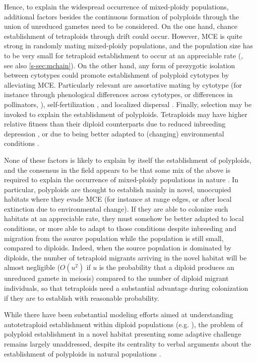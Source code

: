 \documentclass[11pt,a4paper]{article}
\begin{document}
Hence, to explain the widespread occurrence of mixed-ploidy populations,
additional factors besides the continuous formation of polyploids through the
union of unreduced gametes need to be considered.
On the one hand, chance establishment of tetraploids through drift could occur.
However, MCE is quite strong in randomly mating mixed-ploidy populations, and
the population size has to be very small for tetraploid establishment to occur
at an appreciable rate (\cite{rausch2005}, see also \cref{s-sec:mchain}).
On the other hand, any form of prezygotic isolation between cytotypes could
promote establishment of polyploid cytotypes by alleviating MCE.
Particularly relevant are assortative mating by cytotype  (for instance through
phenological differences across cytotypes, or differences in pollinators,
\citep{kolar2017}), self-fertilization \citep{rausch2005}, and localized
dispersal \citep{baack2005,kolar2017}.
Finally, selection may be invoked to explain the establishment of polyploids.
Tetraploids may have higher relative fitness than their diploid counterparts
due to reduced inbreeding depression \citep{ronfort1999}, or due to being
better adapted to (changing) environmental conditions \citep{vandepeer2021}. 

None of these factors is likely to explain by itself the establishment of
polyploids, and the consensus in the field appears to be that some mix of the
above is required to explain the occurrence of mixed-ploidy populations in
nature \citep{kolar2017,mortier2024}.
In particular, polyploids are thought to establish mainly in novel, unoccupied
habitats where they evade MCE (for instance at range edges, or after local
extinction due to environmental change).
If they are able to colonize such habitats at an appreciable rate, they must
somehow be better adapted to local conditions, or more able to adapt to those
conditions despite inbreeding and migration from the source population while
the population is still small, compared to diploids.
Indeed, when the source population is dominated by diploids, the number of
tetraploid migrants arriving in the novel habitat will be almost negligible
($O(u^2)$ if $u$ is the probability that a diploid produces an unreduced
gamete in meiosis) compared to the number of diploid migrant individuals, so
that tetraploids need a substantial advantage during colonization if they are
to establish with reasonable probability.

While there have been substantial modeling efforts aimed at understanding
autotetraploid establishment within diploid populations (e.g. \cite{levin1975,
felber1991, felber1997, rausch2005, oswald2011, clo2022c, griswold2021}), the
problem of polyploid establishment in a novel habitat presenting some adaptive
challenge remains largely unaddressed, despite its centrality to verbal
arguments about the establishment of polyploids in natural populations
\citep{kolar2017, vandepeer2021, clo2022d}.
\end{document}

